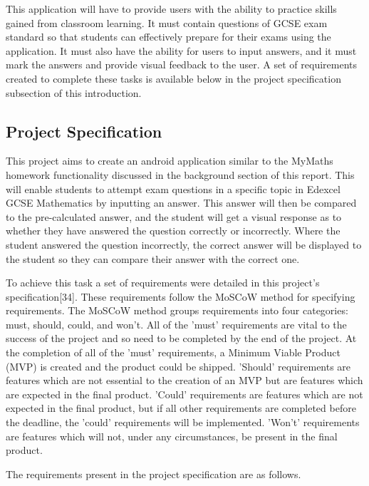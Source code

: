 \documentclass{article}
\begin{document}
This application will have to provide users with the ability to practice skills gained from classroom learning. It must contain questions of GCSE exam standard so that students can effectively prepare for their exams using the application. It must also have the ability for users to input answers, and it must mark the answers and provide visual feedback to the user. A set of requirements created to complete these tasks is available below in the project specification subsection of this introduction. \par

\subsection{Project Specification}

This project aims to create an android application similar to the MyMaths homework functionality discussed in the background section of this report. This will enable students to attempt exam questions in a specific topic in Edexcel GCSE Mathematics by inputting an answer. This answer will then be compared to the pre-calculated answer, and the student will get a visual response as to whether they have answered the question correctly or incorrectly. Where the student answered the question incorrectly, the correct answer will be displayed to the student so they can compare their answer with the correct one. \par

To achieve this task a set of requirements were detailed in this project's specification[34]. These requirements follow the MoSCoW method for specifying requirements. The MoSCoW method groups requirements into four categories: must, should, could, and won't. All of the 'must' requirements are vital to the success of the project and so need to be completed by the end of the project. At the completion of all of the 'must' requirements, a Minimum Viable Product (MVP) is created and the product could be shipped. 'Should' requirements are features which are not essential to the creation of an MVP but are features which are expected in the final product. 'Could' requirements are features which are not expected in the final product, but if all other requirements are completed before the deadline, the 'could' requirements will be implemented. 'Won't' requirements are features which will not, under any circumstances, be present in the final product. \par

The requirements present in the project specification are as follows. \par
\end{document}
